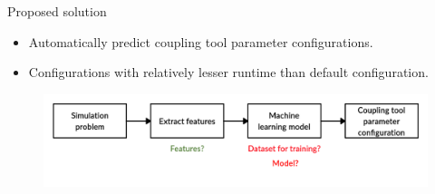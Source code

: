 \documentclass[10pt]{beamer}
\begin{document}


\begin{frame}[t]{Proposed solution}

\begin{itemize}
    \item Automatically predict coupling tool parameter configurations.
    \newline
    \item Configurations with relatively lesser runtime than default configuration.
\end{itemize} 
\begin{figure}[h!]
\centering
\includegraphics[trim={0 3cm 0 0},width=\linewidth]{images/proposedstrategy_challenge2a.jpg}
\label{fig:simplegoal_challenge2}
\end{figure}  
    
\end{frame}
\end{document}

